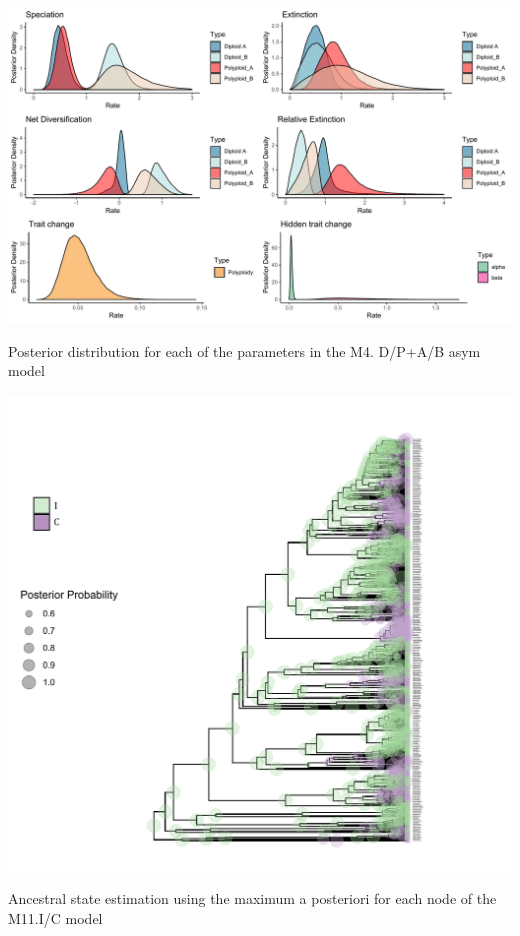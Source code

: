 \begin{suppfigure}
\includegraphics[width=\textwidth]{hisseDPnodipasymposteriordist.pdf}
\caption{Posterior distribution for each of the parameters in the M4. D/P+A/B asym model} %
\label{suppfigure:DPnodipAB}
\end{suppfigure}

\begin{suppfigure}
\includegraphics[width=\textwidth]{asrIC.pdf}
\caption{Ancestral state estimation using the maximum a posteriori for each node of the M11.I/C model} %
\label{suppfigure:ICasr}
\end{suppfigure}


